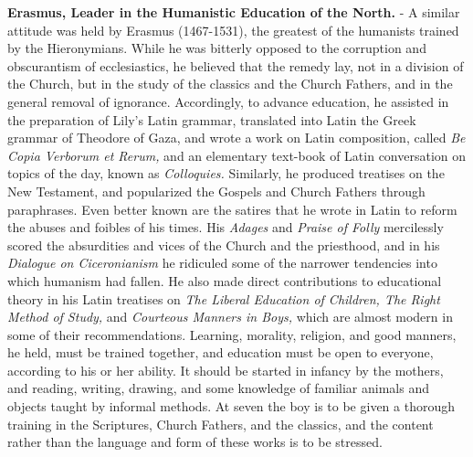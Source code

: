 \documentclass[]{book}
\begin{document}
\textbf{Erasmus, Leader in the Humanistic Education of the North.} - A similar attitude was held by Erasmus (1467-1531), the greatest of the humanists trained by the Hieronymians. While he was bitterly opposed to the corruption and obscurantism of ecclesiastics, he believed that the remedy lay, not in a division of the Church, but in the study of the classics and the Church Fathers, and in the general removal of ignorance. Accordingly, to advance education, he assisted in the preparation of Lily's Latin grammar, translated into Latin the Greek grammar of Theodore of Gaza, and wrote a work on Latin composition, called \emph{Be Copia Verborum et Rerum,} and an elementary text-book of Latin conversation on topics of the day, known as \emph{Colloquies.} Similarly, he produced treatises on the New Testament, and popularized the Gospels and Church Fathers through paraphrases. Even better known are the satires that he wrote in Latin to reform the abuses and foibles of his times. His \emph{Adages} and \emph{Praise of Folly} mercilessly scored the absurdities and vices of the Church and the priesthood, and in his \emph{Dialogue on Ciceronianism} he ridiculed some of the narrower tendencies into which humanism had fallen. He also made direct contributions to educational theory in his Latin treatises on \emph{The Liberal Education of Children, The Right Method of Study,} and \emph{Courteous Manners in Boys,} which are almost modern in some of their recommendations. Learning, morality, religion, and good manners, he held, must be trained together, and education must be open to everyone, according to his or her ability. It should be started in infancy by the mothers, and reading, writing, drawing, and some knowledge of familiar animals and objects taught by informal methods. At seven the boy is to be given a thorough training in the Scriptures, Church Fathers, and the classics, and the content rather than the language and form of these works is to be stressed.
\end{document}
